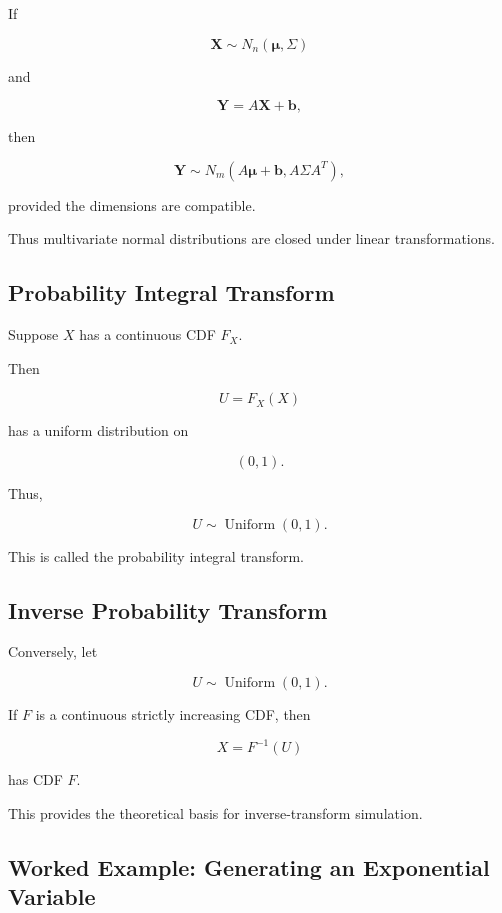 If

\[
\mathbf{X}
\sim
N_n(\boldsymbol{\mu},\Sigma)
\]

and

\[
\mathbf{Y}
=
A\mathbf{X}+\mathbf{b},
\]

then

\[
\boxed{
\mathbf{Y}
\sim
N_m
\left(
A\boldsymbol{\mu}+\mathbf{b},
A\Sigma A^T
\right),
}
\]

provided the dimensions are compatible.

Thus multivariate normal distributions are closed under linear
transformations.

\subsection{Probability Integral Transform}
\label{subsec:probability-integral-transform}

Suppose \(X\) has a continuous CDF \(F_X\).

Then

\[
\boxed{
U=F_X(X)
}
\]

has a uniform distribution on

\[
(0,1).
\]

Thus,

\[
\boxed{
U\sim\operatorname{Uniform}(0,1).
}
\]

This is called the probability integral transform.

\subsection{Inverse Probability Transform}
\label{subsec:inverse-probability-transform}

Conversely, let

\[
U\sim\operatorname{Uniform}(0,1).
\]

If \(F\) is a continuous strictly increasing CDF, then

\[
\boxed{
X=F^{-1}(U)
}
\]

has CDF \(F\).

This provides the theoretical basis for inverse-transform simulation.

\subsection{Worked Example: Generating an Exponential Variable}
\label{subsec:worked-generate-exponential}


